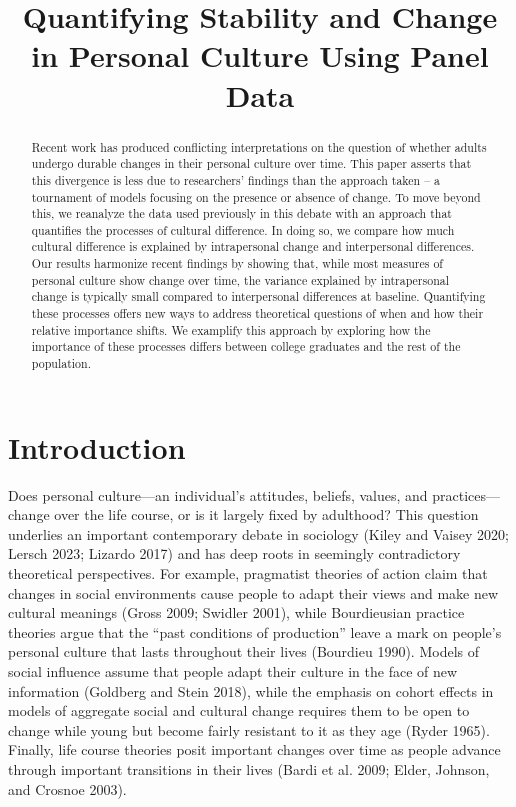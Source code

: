 \documentclass[
  12pt,
]{article}
\title{Quantifying Stability and Change in Personal Culture Using Panel
Data}
\author{}
\date{\vspace{-2.5em}}
\begin{document}
\maketitle
\begin{abstract}
Recent work has produced conflicting interpretations on the question of
whether adults undergo durable changes in their personal culture over
time. This paper asserts that this divergence is less due to
researchers' findings than the approach taken -- a tournament of models
focusing on the presence or absence of change. To move beyond this, we
reanalyze the data used previously in this debate with an approach that
quantifies the processes of cultural difference. In doing so, we compare
how much cultural difference is explained by intrapersonal change and
interpersonal differences. Our results harmonize recent findings by
showing that, while most measures of personal culture show change over
time, the variance explained by intrapersonal change is typically small
compared to interpersonal differences at baseline. Quantifying these
processes offers new ways to address theoretical questions of when and
how their relative importance shifts. We examplify this approach by
exploring how the importance of these processes differs between college
graduates and the rest of the population.
\end{abstract}

\hypertarget{introduction}{%
\section{Introduction}\label{introduction}}

Does personal culture---an individual's attitudes, beliefs, values, and
practices---change over the life course, or is it largely fixed by
adulthood? This question underlies an important contemporary debate in
sociology (Kiley and Vaisey 2020; Lersch 2023; Lizardo 2017) and has
deep roots in seemingly contradictory theoretical perspectives. For
example, pragmatist theories of action claim that changes in social
environments cause people to adapt their views and make new cultural
meanings (Gross 2009; Swidler 2001), while Bourdieusian practice
theories argue that the ``past conditions of production'' leave a mark
on people's personal culture that lasts throughout their lives (Bourdieu
1990). Models of social influence assume that people adapt their culture
in the face of new information (Goldberg and Stein 2018), while the
emphasis on cohort effects in models of aggregate social and cultural
change requires them to be open to change while young but become fairly
resistant to it as they age (Ryder 1965). Finally, life course theories
posit important changes over time as people advance through important
transitions in their lives (Bardi et al. 2009; Elder, Johnson, and
Crosnoe 2003).
\end{document}
